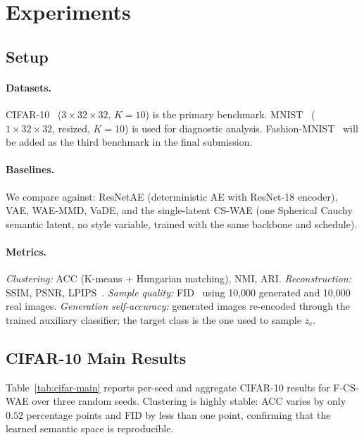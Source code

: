 \documentclass[10pt]{article}
\newcommand{\ours}{F-CS-WAE}
\newcommand{\simple}{CS-WAE}
\newcommand{\zc}{z_{\mathrm{c}}}
\begin{document}
\section{Experiments}

\subsection{Setup}

\paragraph{Datasets.}
CIFAR-10~\citep{krizhevsky2009learning} ($3\times32\times32$, $K=10$) is the primary
benchmark.
MNIST~\citep{lecun1998gradient} ($1\times32\times32$, resized, $K=10$) is used for
diagnostic analysis.
Fashion-MNIST~\citep{xiao2017fashion} will be added as the third benchmark in the
final submission.

\paragraph{Baselines.}
We compare against: ResNetAE (deterministic AE with ResNet-18 encoder), VAE,
WAE-MMD, VaDE, and the single-latent \simple{} (one Spherical Cauchy semantic
latent, no style variable, trained with the same backbone and schedule).

\paragraph{Metrics.}
\emph{Clustering:} ACC (K-means + Hungarian matching), NMI, ARI.
\emph{Reconstruction:} SSIM, PSNR, LPIPS~\citep{zhang2018unreasonable}.
\emph{Sample quality:} FID~\citep{heusel2017gans} using 10{,}000 generated and
10{,}000 real images.
\emph{Generation self-accuracy:} generated images re-encoded through the trained
auxiliary classifier; the target class is the one used to sample $\zc$.

\subsection{CIFAR-10 Main Results}
\label{sec:cifar10}

Table~\ref{tab:cifar-main} reports per-seed and aggregate CIFAR-10 results for
\ours{} over three random seeds.
Clustering is highly stable: ACC varies by only $0.52$ percentage points and FID
by less than one point, confirming that the learned semantic space is reproducible.
\end{document}
